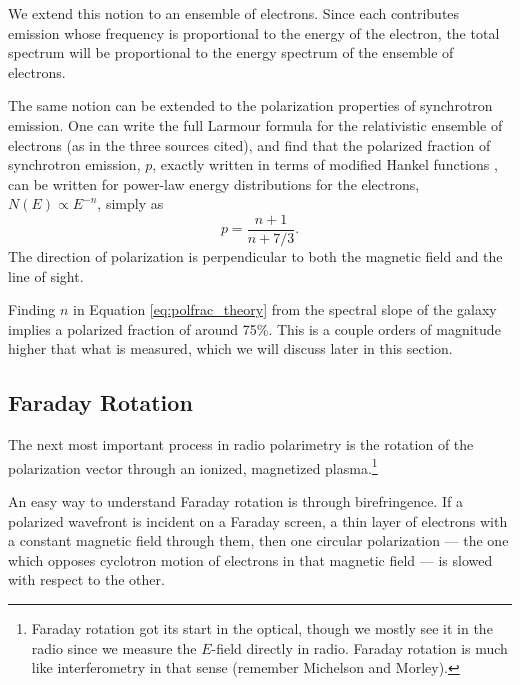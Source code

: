 We extend this notion to an ensemble of electrons. Since each contributes emission whose frequency
is proportional to the energy of the electron, the total spectrum will be proportional to the energy
spectrum of the ensemble of electrons.

The same notion can be extended to the polarization properties of synchrotron emission. One can
write the full Larmour formula for the relativistic ensemble of electrons (as in the three sources
cited), and find that the polarized fraction of synchrotron emission, 
$p$, exactly written in terms of modified Hankel functions 
\cite{Westfold1959}, can be written for power-law energy distributions for the electrons, $N(E)\propto E^{-n}$, 
simply as
\begin{equation}
  p = \frac{n+1}{n+7/3}.
  \label{eq:polfrac_theory}
\end{equation}
The direction of polarization is perpendicular to both the magnetic field and the line of sight.

Finding $n$ in Equation \ref{eq:polfrac_theory} from the spectral slope of the galaxy implies a
polarized fraction of around 75\%. This is a couple orders of magnitude higher that what is
measured, which we will discuss later in this section. 

\subsection{Faraday Rotation}

The next most important process in radio polarimetry is the rotation of the polarization vector
through an ionized, magnetized plasma.\footnote{Faraday rotation got its start in the optical,
  though we mostly see it in the radio since we measure the $E$-field directly in radio. Faraday
rotation is much like interferometry in that sense (remember Michelson and Morley).}

An easy way to understand Faraday rotation is through birefringence. If a polarized wavefront is
incident on a Faraday screen, a thin layer of electrons with a constant magnetic field through them,
then one circular polarization --- the one which opposes cyclotron motion of electrons in that
magnetic field --- is slowed with respect to the other.

